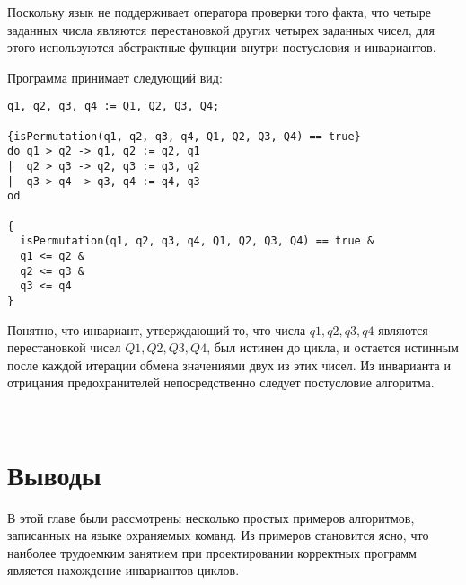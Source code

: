 Поскольку язык не поддерживает оператора проверки того факта, что четыре заданных числа являются
перестановкой других четырех заданных чисел, для этого используются абстрактные функции внутри постусловия
и инвариантов.

Программа принимает следующий вид:
\begin{verbatim}
q1, q2, q3, q4 := Q1, Q2, Q3, Q4;

{isPermutation(q1, q2, q3, q4, Q1, Q2, Q3, Q4) == true}
do q1 > q2 -> q1, q2 := q2, q1
|  q2 > q3 -> q2, q3 := q3, q2
|  q3 > q4 -> q3, q4 := q4, q3
od

{
  isPermutation(q1, q2, q3, q4, Q1, Q2, Q3, Q4) == true &
  q1 <= q2 &
  q2 <= q3 &
  q3 <= q4
}
\end{verbatim} 

Понятно, что инвариант, утверждающий то, что числа $q1, q2, q3, q4$ являются перестановкой чисел $Q1, Q2, Q3, Q4$,
был истинен до цикла, и остается истинным после каждой итерации обмена значениями двух из этих чисел. Из инварианта и
отрицания предохранителей непосредственно следует постусловие алгоритма.

\

\section{Выводы} \label{ch4:conclusion}
В этой главе были рассмотрены несколько простых примеров алгоритмов, записанных на
языке охраняемых команд. Из примеров становится ясно, что наиболее
трудоемким занятием при проектировании корректных программ является нахождение 
инвариантов циклов.

%

